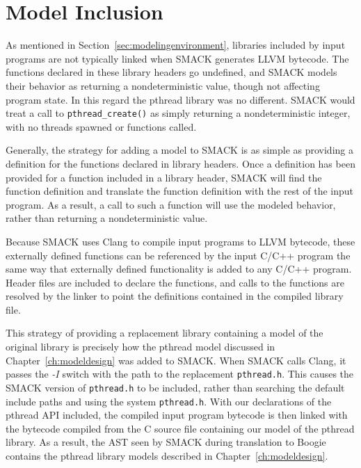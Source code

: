 \section{Model Inclusion}
As mentioned in Section~\ref{sec:modelingenvironment}, libraries
included by input programs are not typically linked when SMACK
generates LLVM bytecode.  The functions declared in these library
headers go undefined, and SMACK models their behavior as returning a
nondeterministic value, though not affecting program state.  In this
regard the pthread library was no different.  SMACK would treat a call
to \lstinline|pthread_create()| as simply returning a nondeterministic
integer, with no threads spawned or functions called. 

Generally, the strategy for adding a model to SMACK is as simple as
providing a definition for the functions declared in library headers.
Once a definition has been provided for a function included in a
library header, SMACK will find the function definition and translate
the function definition with the rest of the input program.  As a
result, a call to such a function will use the modeled behavior,
rather than returning a nondeterministic value.

Because SMACK uses Clang to compile input programs to LLVM bytecode,
these externally defined functions can be referenced by the input
C/C++ program the same way that externally defined functionality is
added to any C/C++ program. Header files are included to declare the
functions, and calls to the functions are resolved by the linker to
point the definitions contained in the compiled library file.

This strategy of providing a replacement library containing a model
of the original library is precisely how the pthread model discussed
in Chapter~\ref{ch:modeldesign} was added to SMACK.  When SMACK calls
Clang, it passes the \emph{-I} switch with the path to the replacement
\lstinline[identifierstyle=\color{black}]|pthread.h|.  This causes the
SMACK version of \lstinline[identifierstyle=\color{black}]|pthread.h|
to be included, rather than searching the default include paths and
using the system \lstinline[identifierstyle=\color{black}]|pthread.h|.
With our declarations of the pthread API included, the compiled input
program bytecode is then linked with the bytecode compiled from the C
source file containing our model of the pthread library. As a result,
the AST seen by SMACK during translation to Boogie contains the
pthread library models described in Chapter~\ref{ch:modeldesign}.

